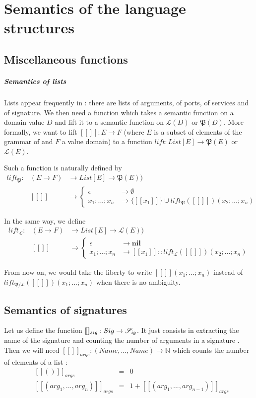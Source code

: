 \section{Semantics of the language structures}

\subsection{Miscellaneous functions}

\subparagraph{Semantics of lists}
Lists appear frequently in \compo : there are lists of arguments, of ports, of services and of signature. We then need a function which takes a semantic function on a domain value $D$ and lift it to a semantic function on $\mathcal{L}(D)$ or $\mathfrak{P}(D)$. More formally, we want to lift $[\![]\!] : E \rightarrow F$ (where $E$ is a subset of elements of the grammar of \compo and $F$ a value domain) to a function $lift: List[E] \rightarrow \mathfrak{P}(E)$ or $\mathcal{L}(E)$.

Such a function is naturally defined by
\[\begin{array}{lll}
lift_\mathfrak{P} :&(E\rightarrow F) &\rightarrow List[E] \rightarrow \mathfrak{P}(E))\\
&[\![]\!] &\rightarrow \begin{cases}
\epsilon &\rightarrow \emptyset \\
x_1; ... ; x_n &\rightarrow \{[\![x_1]\!]\}\cup lift_\mathfrak{P}([\![]\!])(x_2;...;x_n)
\end{cases}
\end{array}
\]

In the same way, we define
\[\begin{array}{lll}
lift_\mathcal{L} :&(E\rightarrow F) &\rightarrow List[E] \rightarrow \mathcal{L}(E))\\
&[\![]\!] &\rightarrow \begin{cases}
\epsilon &\rightarrow \mathbf{nil} \\
x_1; ... ; x_n &\rightarrow [\![x_1]\!] :: lift_\mathcal{L}([\![]\!])(x_2;...;x_n)
\end{cases}
\end{array}
\]
\vspace{0.5cm}

From now on, we would take the liberty to write  $[\![]\!](x_1;...;x_n)$ instead of \newline $lift_{\mathfrak{P}/\mathcal{L}}([\![]\!])(x_1; ... ; x_n)$ when there is no ambiguity.


\subsection{Semantics of signatures}
Let us define the function $[\![]\!]_{sig} :  Sig \rightarrow \mathcal{S}_{ig} $. It just consists in extracting the name of the signature and counting the number of arguments in a signature . Then we will need $[\![]\!]_{args} : (Name, ... , Name) \rightarrow \mathbb{N}$  which counts the number of elements of a list : 
\[\begin{array}{llll}
&[\![()]\!]_{args} &=& 0\\
&[\![(arg_1,...,arg_n)]\!]_{args} &=& 1 + [\![(arg_1,...,arg_{n-1})]\!]_{args} 
\end{array}\]

